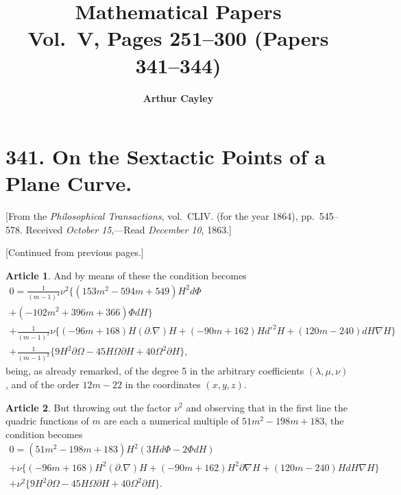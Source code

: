 \documentclass[11pt,a4paper]{article}
\title{\textbf{Mathematical Papers}\\[6pt]
\large Vol.\ V, Pages 251--300 (Papers 341--344)}
\author{\textbf{Arthur Cayley}}
\date{}
\theoremstyle{definition}
\newtheorem{art}{Article}[section]
\begin{document}
\maketitle
\thispagestyle{empty}

\tableofcontents
\newpage

\section{341. On the Sextactic Points of a Plane Curve.}

[From the \textit{Philosophical Transactions}, vol.\ CLIV. (for the year 1864),
pp.~545--578. Received \textit{October 15},---Read \textit{December 10}, 1863.]

[Continued from previous pages.]

\setcounter{art}{9}
\begin{art}
And by means of these the condition becomes
\begin{multline*}
0 = \frac{1}{(m-1)^4} \nu^2 \bigl\{(153m^2 - 594m + 549) H^2 d\Phi \\
+ (-102m^2 + 396m + 366) \Phi dH\bigr\} \\
+ \frac{1}{(m-1)^3} \nu \bigl\{(-96m + 168) H(\partial . \nabla)H
+ (-90m + 162) H d'^2 H + (120m - 240) dH \nabla H\bigr\} \\
+ \frac{1}{(m-1)^2} \bigl\{9H^2 \partial \Omega - 45 H \Omega \partial H
+ 40 \Omega^2 \partial H\bigr\},
\end{multline*}
being, as already remarked, of the degree 5 in the arbitrary coefficients
$(\lambda, \mu, \nu)$, and of the order $12m - 22$ in the coordinates $(x, y, z)$.
\end{art}

\begin{art}
But throwing out the factor $\nu^2$ and observing that in the first line the
quadric functions of $m$ are each a numerical multiple of $51m^2 - 198m + 183$, the
condition becomes
\begin{multline*}
0 = (51m^2 - 198m + 183) H^2 (3H d\Phi - 2\Phi dH) \\
+ \nu \bigl\{(-96m + 168) H^2 (\partial . \nabla)H + (-90m + 162) H^2 \partial \nabla H
+ (120m - 240) H dH \nabla H\bigr\} \\
+ \nu^2 \bigl\{9H^2 \partial \Omega - 45H\Omega \partial H + 40 \Omega^2 \partial H\bigr\}.
\end{multline*}
\end{art}
\end{document}
